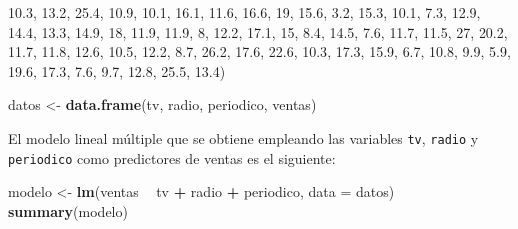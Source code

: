 \documentclass[]{book}
\newenvironment{Shaded}{\begin{snugshade}}{\end{snugshade}}
\newcommand{\KeywordTok}[1]{\textcolor[rgb]{0.13,0.29,0.53}{\textbf{#1}}}
\newcommand{\DataTypeTok}[1]{\textcolor[rgb]{0.13,0.29,0.53}{#1}}
\newcommand{\DecValTok}[1]{\textcolor[rgb]{0.00,0.00,0.81}{#1}}
\newcommand{\FloatTok}[1]{\textcolor[rgb]{0.00,0.00,0.81}{#1}}
\newcommand{\StringTok}[1]{\textcolor[rgb]{0.31,0.60,0.02}{#1}}
\newcommand{\OperatorTok}[1]{\textcolor[rgb]{0.81,0.36,0.00}{\textbf{#1}}}
\newcommand{\NormalTok}[1]{#1}
\begin{document}
\begin{Shaded}
\begin{Highlighting}[]
    \FloatTok{10.3}\NormalTok{, }\FloatTok{13.2}\NormalTok{, }\FloatTok{25.4}\NormalTok{, }\FloatTok{10.9}\NormalTok{, }\FloatTok{10.1}\NormalTok{, }\FloatTok{16.1}\NormalTok{, }\FloatTok{11.6}\NormalTok{, }\FloatTok{16.6}\NormalTok{, }\DecValTok{19}\NormalTok{, }\FloatTok{15.6}\NormalTok{, }\FloatTok{3.2}\NormalTok{, }\FloatTok{15.3}\NormalTok{, }\FloatTok{10.1}\NormalTok{, }
    \FloatTok{7.3}\NormalTok{, }\FloatTok{12.9}\NormalTok{, }\FloatTok{14.4}\NormalTok{, }\FloatTok{13.3}\NormalTok{, }\FloatTok{14.9}\NormalTok{, }\DecValTok{18}\NormalTok{, }\FloatTok{11.9}\NormalTok{, }\FloatTok{11.9}\NormalTok{, }\DecValTok{8}\NormalTok{, }\FloatTok{12.2}\NormalTok{, }\FloatTok{17.1}\NormalTok{, }\DecValTok{15}\NormalTok{, }\FloatTok{8.4}\NormalTok{, }\FloatTok{14.5}\NormalTok{, }
    \FloatTok{7.6}\NormalTok{, }\FloatTok{11.7}\NormalTok{, }\FloatTok{11.5}\NormalTok{, }\DecValTok{27}\NormalTok{, }\FloatTok{20.2}\NormalTok{, }\FloatTok{11.7}\NormalTok{, }\FloatTok{11.8}\NormalTok{, }\FloatTok{12.6}\NormalTok{, }\FloatTok{10.5}\NormalTok{, }\FloatTok{12.2}\NormalTok{, }\FloatTok{8.7}\NormalTok{, }\FloatTok{26.2}\NormalTok{, }\FloatTok{17.6}\NormalTok{, }
    \FloatTok{22.6}\NormalTok{, }\FloatTok{10.3}\NormalTok{, }\FloatTok{17.3}\NormalTok{, }\FloatTok{15.9}\NormalTok{, }\FloatTok{6.7}\NormalTok{, }\FloatTok{10.8}\NormalTok{, }\FloatTok{9.9}\NormalTok{, }\FloatTok{5.9}\NormalTok{, }\FloatTok{19.6}\NormalTok{, }\FloatTok{17.3}\NormalTok{, }\FloatTok{7.6}\NormalTok{, }\FloatTok{9.7}\NormalTok{, }\FloatTok{12.8}\NormalTok{, }
    \FloatTok{25.5}\NormalTok{, }\FloatTok{13.4}\NormalTok{)}

\NormalTok{datos <-}\StringTok{ }\KeywordTok{data.frame}\NormalTok{(tv, radio, periodico, ventas)}
\end{Highlighting}
\end{Shaded}

El modelo lineal múltiple que se obtiene empleando las variables
\texttt{tv}, \texttt{radio} y \texttt{periodico} como predictores de
ventas es el siguiente:

\begin{Shaded}
\begin{Highlighting}[]
\NormalTok{modelo <-}\StringTok{ }\KeywordTok{lm}\NormalTok{(ventas }\OperatorTok{~}\StringTok{ }\NormalTok{tv }\OperatorTok{+}\StringTok{ }\NormalTok{radio }\OperatorTok{+}\StringTok{ }\NormalTok{periodico, }\DataTypeTok{data =}\NormalTok{ datos)}
\KeywordTok{summary}\NormalTok{(modelo)}
\end{Highlighting}
\end{Shaded}
\end{document}
